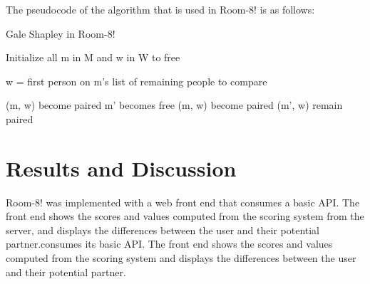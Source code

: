 \documentclass[journal]{IEEEtran}
\begin{document}
The pseudocode of the algorithm that is used in Room-8! is as follows:
\newpage
\begin{algorithm}
\caption{Gale Shapley in Room-8!}\label{gale-shapley}

    Initialize all m in M and w in W to free\;

     {
        w = first person on m’s list of remaining people to compare\par
         {
                (m, w) become paired
        } {
             {
                    m' becomes free
                    (m, w) become paired
            } {
                (m', w) remain paired
            }
        }
    }
\end{algorithm}


\section{Results and Discussion}
Room-8! was implemented with a web front end that consumes a basic API. The front end shows the scores and values
computed from the scoring system from the server, and displays the differences between the user and their potential
partner.consumes its basic API. The front end shows the scores and values computed from the scoring system and displays
the differences between the user and their potential partner.
\end{document}
